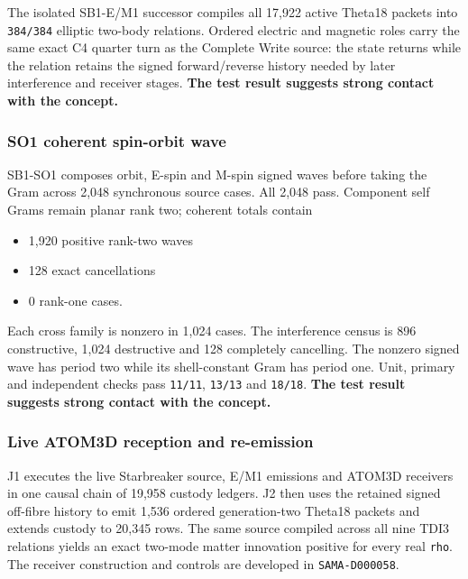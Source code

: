 The isolated SB1-E/M1 successor compiles all 17,922 active Theta18
packets into \texttt{384/384} elliptic two-body relations. Ordered
electric and magnetic roles carry the same exact C4 quarter turn as the
Complete Write source: the state returns while the relation retains the
signed forward/reverse history needed by later interference and receiver
stages. \textbf{The test result suggests strong contact with the
concept.}

\subsubsection{SO1 coherent spin-orbit
wave}\label{viii-ch08-so1-coherent-spin-orbit-wave}

SB1-SO1 composes orbit, E-spin and M-spin signed waves before taking the
Gram across 2,048 synchronous source cases. All 2,048 pass. Component
self Grams remain planar rank two; coherent totals contain

\begin{itemize}
\tightlist
\item
  1,920 positive rank-two waves
\item
  128 exact cancellations
\item
  0 rank-one cases.
\end{itemize}

Each cross family is nonzero in 1,024 cases. The interference census is
896 constructive, 1,024 destructive and 128 completely cancelling. The
nonzero signed wave has period two while its shell-constant Gram has
period one. Unit, primary and independent checks pass \texttt{11/11},
\texttt{13/13} and \texttt{18/18}. \textbf{The test result suggests
strong contact with the concept.}

\subsubsection{Live ATOM3D reception and
re-emission}\label{viii-ch08-live-atom3d-reception-and-re-emission}

J1 executes the live Starbreaker source, E/M1 emissions and ATOM3D
receivers in one causal chain of 19,958 custody ledgers. J2 then uses
the retained signed off-fibre history to emit 1,536 ordered
generation-two Theta18 packets and extends custody to 20,345 rows. The
same source compiled across all nine TDI3 relations yields an exact
two-mode matter innovation positive for every real \texttt{rho}. The
receiver construction and controls are developed in
\texttt{SAMA-D000058}.

